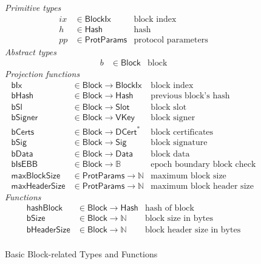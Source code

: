 \documentclass[11pt,a4paper]{article}
\newcommand{\fun}[1]{\mathsf{#1}}
\newcommand{\type}[1]{\mathsf{#1}}
\newcommand{\seqof}[1]{#1^{*}}
\newcommand{\Hash}{\type{Hash}}  %
\newcommand{\Slot}{\type{Slot}}
\newcommand{\BlockIx}{\type{BlockIx}}
\newcommand{\Block}{\type{Block}}
\newcommand{\DCert}{\type{DCert}}
\newcommand{\VKey}{\type{VKey}}
\newcommand{\Sig}{\type{Sig}}
\newcommand{\Data}{\type{Data}}
\newcommand{\ProtParams}{\type{ProtParams}} %
\newcommand{\hashname}{bHash}
\newcommand{\bsizename}{bSize}
\newcommand{\bhdrsizename}{bHeaderSize}
\newcommand{\hashofblockname}{hashBlock}
\newcommand{\maxblocksizename}{maxBlockSize}
\newcommand{\maxheadersizename}{maxHeaderSize}
\newcommand{\isebbname}{bIsEBB}
\newcommand{\bdataname}{bData}
\newcommand{\bcertsname}{bCerts}
\newcommand{\bsigname}{bSig}
\newcommand{\bixname}{bIx}
\newcommand{\bslname}{bSl}
\newcommand{\bsignername}{bSigner}
\newcommand{\totalf}{\to}
\begin{document}
\begin{figure}
  \emph{Primitive types}
  \begin{align*}
    ix & \in \BlockIx & \text{block index}\\
    h  & \in \Hash   & \text{hash}\\
    pp & \in \ProtParams & \text{protocol parameters}
  \end{align*}
  \emph{Abstract types}
  \begin{align*}
    b & \in \Block & \text{block}
  \end{align*}
  \emph{Projection functions}
  \begin{align*}
    \fun{\bixname} & \in \Block \totalf \BlockIx & \text{block index} \\
    \fun{\hashname} & \in \Block \totalf \Hash
      & \text{previous block's hash} \\
    \fun{\bslname} & \in \Block \totalf \Slot & \text{block slot} \\
    \fun{\bsignername} & \in \Block \totalf \VKey & \text{block signer} \\
    \fun{\bcertsname} & \in \Block \totalf \seqof{\DCert}
      & \text{block certificates} \\
    \fun{\bsigname} & \in \Block \totalf \Sig & \text{block signature} \\
    \fun{\bdataname} & \in \Block \totalf \Data & \text{block data} \\
    \fun{\isebbname} & \in \Block \totalf \mathbb{B} & \text{epoch boundary block check}\\
    \fun{\maxblocksizename} & \in \ProtParams \totalf \mathbb{N} & \text{maximum block size} \\
    \fun{\maxheadersizename} & \in \ProtParams \totalf \mathbb{N}
      & \text{maximum block header size}
  \end{align*}
  \emph{Functions}
  \begin{align*}
    \fun{\hashofblockname} & \in \Block \totalf \Hash & \text{hash of block} \\
    \fun{\bsizename} & \in \Block \totalf \mathbb{N} & \text{block size in bytes} \\
    \fun{\bhdrsizename} & \in \Block \totalf \mathbb{N}
      & \text{block header size in bytes}\\
  \end{align*}
  \caption{Basic Block-related Types and Functions}
  \label{fig:block-defs}
\end{figure}
\end{document}
